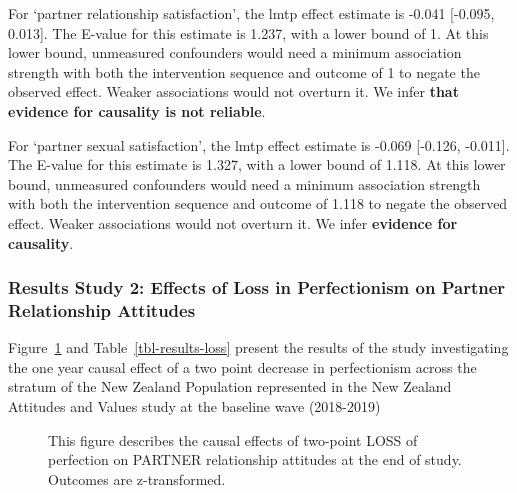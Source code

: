 \documentclass[
  singlecolumn]{article}
\begin{document}
For `partner relationship satisfaction', the lmtp effect estimate is
-0.041 {[}-0.095, 0.013{]}. The E-value for this estimate is 1.237, with
a lower bound of 1. At this lower bound, unmeasured confounders would
need a minimum association strength with both the intervention sequence
and outcome of 1 to negate the observed effect. Weaker associations
would not overturn it. We infer \textbf{that evidence for causality is
not reliable}.

For `partner sexual satisfaction', the lmtp effect estimate is -0.069
{[}-0.126, -0.011{]}. The E-value for this estimate is 1.327, with a
lower bound of 1.118. At this lower bound, unmeasured confounders would
need a minimum association strength with both the intervention sequence
and outcome of 1.118 to negate the observed effect. Weaker associations
would not overturn it. We infer \textbf{evidence for causality}.

\newpage{}

\subsubsection{Results Study 2: Effects of Loss in Perfectionism on
Partner Relationship
Attitudes}\label{results-study-2-effects-of-loss-in-perfectionism-on-partner-relationship-attitudes}

Figure~\ref{fig-results-loss} and Table~\ref{tbl-results-loss} present
the results of the study investigating the one year causal effect of a
two point decrease in perfectionism across the stratum of the New
Zealand Population represented in the New Zealand Attitudes and Values
study at the baseline wave (2018-2019)

\begin{figure}


\caption{\label{fig-results-loss}This figure describes the causal
effects of two-point LOSS of perfection on PARTNER relationship
attitudes at the end of study. Outcomes are z-transformed.}

\end{figure}%
\end{document}
